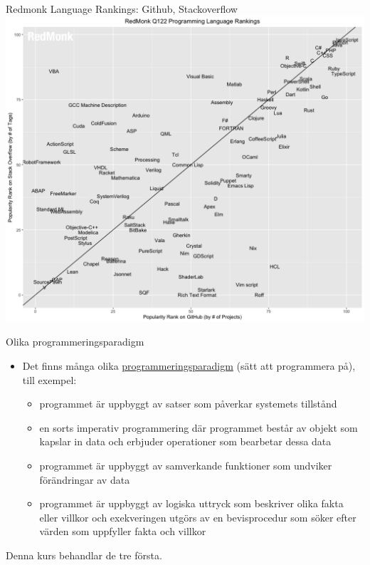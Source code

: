\ifkompendium\else
\begin{SlideExtra}{Redmonk Language Rankings: Github, Stackoverflow}
\includegraphics[width=0.80\columnwidth]{../img/redmonk-Q122}
\end{SlideExtra}

\fi

\begin{Slide}{Olika programmeringsparadigm}
\begin{itemize}
\item Det finns många olika \href{https://en.wikipedia.org/wiki/Programming_paradigm}{programmeringsparadigm} (sätt att programmera på), till exempel:
\begin{itemize}\SlideFontSmall
\item {} programmet är uppbyggt av satser som påverkar systemets tillstånd
\item {} en sorts imperativ programmering där programmet består av objekt som kapslar in data och erbjuder operationer som bearbetar dessa data
\item {} programmet är uppbyggt av samverkande funktioner som undviker förändringar av data
\item {} programmet är uppbyggt av logiska uttryck som beskriver olika fakta eller villkor och exekveringen utgörs av en bevisprocedur som söker efter värden som uppfyller fakta och villkor
\end{itemize}
\end{itemize}
Denna kurs behandlar de tre första.
\end{Slide}


